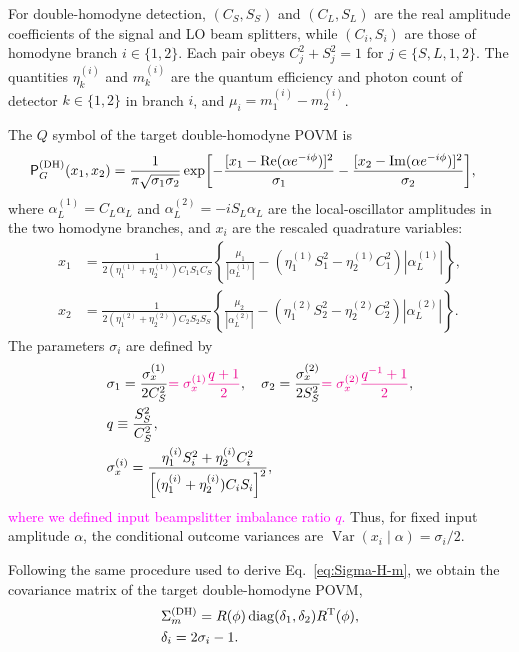 \documentclass[%
final, 
superscriptaddress,
 amsmath,amssymb,amsfonts,
 aps,
 pra,
 longbibliography,
]{revtex4-2}
\newcommand{\tcnj}[1]{{#1}^{\mathrm{T}}}
\newcommand{\diag}{\mathop{\rm diag}\nolimits}
\renewcommand{\Re}{\mathop{\rm Re}\nolimits}
\renewcommand{\Im}{\mathop{\rm Im}\nolimits}
\newcommand{\ind}[1]{\mathrm{#1}}
\newcommand{\prob}{\mathsf{P}}
\begin{document}
For double-homodyne detection, $(C_S,S_S)$ and $(C_L,S_L)$ are the real amplitude coefficients of the signal and LO beam splitters, while $(C_i,S_i)$ are those of homodyne branch $i\in\{1,2\}$. Each pair obeys $C_j^2+S_j^2=1$ for $j\in\{S,L,1,2\}$. The quantities $\eta_k^{(i)}$ and $m_k^{(i)}$ are the quantum efficiency and photon count of detector $k\in\{1,2\}$ in branch $i$, and $\mu_i=m_1^{(i)}-m_2^{(i)}$.

The $Q$ symbol of the target double-homodyne POVM is
\begin{align}
  \label{eq:P_G-x1x2}
  &
    \prob_G^{(\ind{DH})}(x_1,x_2)
    =\frac{1}{\pi\sqrt{\sigma_1\sigma_2}}
    \exp\biggl[
    -\frac{[x_1-\Re(\alpha e^{-i\phi})]^2}{\sigma_1}
    -\frac{[x_2-\Im(\alpha e^{-i\phi})]^2}{\sigma_2}
    \biggr],
\end{align}
where $\alpha_L^{(1)}=C_L\alpha_L$ and $\alpha_L^{(2)}=-iS_L\alpha_L$ are the local-oscillator amplitudes in the two homodyne branches, and $x_i$ are the rescaled quadrature variables:
\begin{align}
  \label{eq:x-1}
  x_1&=
  \frac{1}{2(\eta_1^{(1)}+\eta_2^{(1)})C_1S_1C_S}
  \left\{
  \frac{\mu_1}{|\alpha_L^{(1)}|}-(\eta_1^{(1)}S_1^2-\eta_2^{(1)}C_1^2) |\alpha_L^{(1)}|
    \right\},
  \\
  \label{eq:x-2}
  x_2&=
  \frac{1}{2(\eta_1^{(2)}+\eta_2^{(2)})C_2S_2S_S}
  \left\{
  \frac{\mu_2}{|\alpha_L^{(2)}|}-(\eta_1^{(2)}S_2^2-\eta_2^{(2)}C_2^2) |\alpha_L^{(2)}|
    \right\}.
\end{align}
The parameters $\sigma_i$ are defined by
\begin{align}
  &
  \label{eq:sigm-i}
    \sigma_1=\frac{\sigma_x^{(1)}}{ 2 C_S^2}
    \textcolor{magenta}{=\sigma_x^{(1)}\frac{q+1}{2}}
    ,
    \quad
    \sigma_2=\frac{\sigma_x^{(2)}}{ 2 S_S^2}
    \textcolor{magenta}{=\sigma_x^{(2)}\frac{q^{-1}+1}{2}}
    ,
  \\
  &
  \label{eq:def-q}
  q\equiv \frac{S_S^2}{C_S^2},
  \\
  &
    \label{eq:sigm-x-i}
    \sigma_x^{(i)}=\frac{\eta_1^{(i)}S_i^2+\eta_2^{(i)}C_i^2}{
    \left[(\eta_1^{(i)}+\eta_2^{(i)})C_i S_i\right]^2
    },
\end{align}
\textcolor{magenta}{where we defined input beampslitter imbalance ratio $q$.}
Thus, for fixed input amplitude $\alpha$, the conditional outcome variances are $\operatorname{Var}(x_i\mid\alpha)=\sigma_i/2$.

Following the same procedure used to derive Eq.~\eqref{eq:Sigma-H-m}, we obtain the covariance matrix of the target double-homodyne POVM,
\begin{align}
\label{eq:Sigma_m-DH}
  &
  \Sigma_m^{(\ind{DH})}=R(\phi)\diag(\delta_1,\delta_2)\tcnj{R}(\phi),
  \\
  \label{eq:sigma-i}
  &
    \delta_i=2\sigma_i-1.
\end{align}
\end{document}
